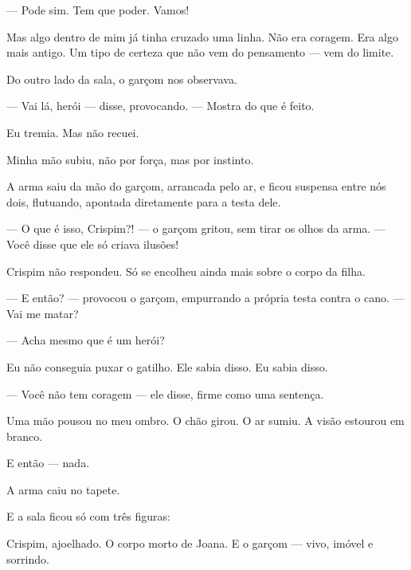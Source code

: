 — Pode sim. Tem que poder. Vamos!

Mas algo dentro de mim já tinha cruzado uma linha.  
Não era coragem.  
Era algo mais antigo.  
Um tipo de certeza que não vem do pensamento — vem do limite.

Do outro lado da sala, o garçom nos observava.

— Vai lá, herói — disse, provocando. — Mostra do que é feito.

Eu tremia.  
Mas não recuei.

Minha mão subiu, não por força, mas por instinto.

A arma saiu da mão do garçom, arrancada pelo ar, e ficou suspensa entre nós dois, flutuando, apontada diretamente para a testa dele.

— O que é isso, Crispim?! — o garçom gritou, sem tirar os olhos da arma. — Você disse que ele só criava ilusões!

Crispim não respondeu.  
Só se encolheu ainda mais sobre o corpo da filha.

— E então? — provocou o garçom, empurrando a própria testa contra o cano. — Vai me matar?  

— Acha mesmo que é um herói?

Eu não conseguia puxar o gatilho.  
Ele sabia disso.  
Eu sabia disso.

— Você não tem coragem — ele disse, firme como uma sentença.

Uma mão pousou no meu ombro.  
O chão girou.  
O ar sumiu.  
A visão estourou em branco.

E então — nada.

A arma caiu no tapete.

E a sala ficou só com três figuras:

Crispim, ajoelhado.  
O corpo morto de Joana.  
E o garçom — vivo, imóvel e sorrindo.
